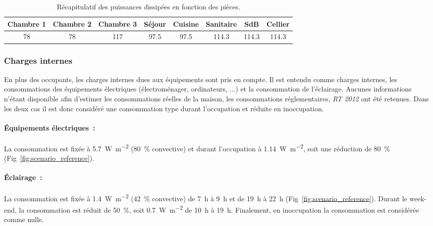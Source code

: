 \begin{table}
\centering
\caption{Récapitulatif des puissances dissipées en fonction des pièces.}
\label{tab:puissance_occupants}
\begin{tabular}{*8{c}}
    \toprule
    Chambre 1 & Chambre 2  & Chambre 3 & Séjour     & Cuisine    & Sanitaire   & SdB         & Cellier     \\
    \midrule
    \num{78}  & \num{78}   & \num{117} & \num{97.5} & \num{97.5} & \num{114.3} & \num{114.3} & \num{114.3} \\
    \bottomrule
\end{tabular}
\end{table}


\subsubsection{Charges internes} %
\label{ssub:charges_internes}
En plus des occupants, les charges internes dues aux équipements sont pris en compte. Il
est entendu comme charges internes, les consommations des équipements électriques
(électroménager, ordinateurs, ...) et la consommation de l’éclairage. Aucunes informations
n’étant disponible afin d’estimer les consommations réelles de la maison, les
consommations réglementaires, \emph{RT 2012} \parencite{CSTB2011} ont été retenues.
Dans les deux cas il est donc considéré une consommation type durant l’occupation
et réduite en inoccupation.

\paragraph{Équipements électriques~:} %
\label{par:equipements_electriques}
La consommation est fixée à \SI{5.7}{\watt\per m^{2}} (\SI{80}{\percent}
convective) et durant l’occupation à \SI{1.14}{\watt\per m^{2}}, soit une
réduction de \SI{80}{\percent} (Fig~\ref{fig:scenario_reference}).

\paragraph{Éclairage~:} %
\label{par:eclairage}
La consommation est fixée à \SI{1.4}{\watt\per m^{2}} (\SI{42}{\percent} convective) de
\SI{7}{\hour} à \SI{9}{\hour} et de \SI{19}{\hour} à \SI{22}{\hour}
(Fig~\ref{fig:scenario_reference}). Durant le week-end, la consommation est réduit de
\SI{50}{\percent}, soit \SI{0.7}{\watt\per m^{2}} de \SI{10}{\hour} à \SI{19}{\hour}.
Finalement, en inoccupation la consommation est considérée comme nulle.


